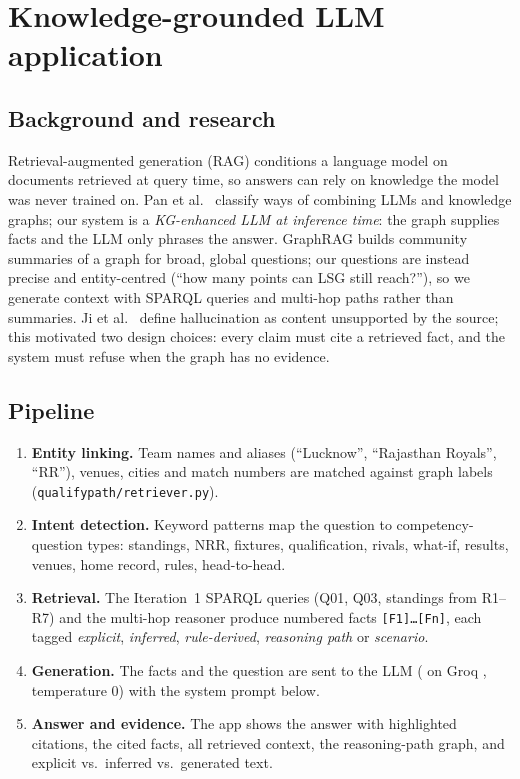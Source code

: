 \section{Knowledge-grounded LLM application}\label{sec:app}

\subsection{Background and research}
Retrieval-augmented generation (RAG) \citep{lewis2020rag} conditions a language model on documents retrieved at
query time, so answers can rely on knowledge the model was never trained on. Pan et al.\ \citep{pan2024unifying}
classify ways of combining LLMs and knowledge graphs; our system is a \emph{KG-enhanced LLM at inference time}:
the graph supplies facts and the LLM only phrases the answer. GraphRAG \citep{edge2024graphrag} builds community
summaries of a graph for broad, global questions; our questions are instead precise and entity-centred
(``how many points can LSG still reach?''), so we generate context with SPARQL queries and multi-hop paths
rather than summaries. Ji et al.\ \citep{ji2023hallucination} define hallucination as content unsupported by the
source; this motivated two design choices: every claim must cite a retrieved fact, and the system must refuse
when the graph has no evidence.

\subsection{Pipeline}
\begin{enumerate}
  \item \textbf{Entity linking.} Team names and aliases (``Lucknow'', ``Rajasthan Royals'', ``RR''), venues,
        cities and match numbers are matched against graph labels (\texttt{qualifypath/retriever.py}).
  \item \textbf{Intent detection.} Keyword patterns map the question to competency-question types: standings,
        NRR, fixtures, qualification, rivals, what-if, results, venues, home record, rules, head-to-head.
  \item \textbf{Retrieval.} The Iteration~1 SPARQL queries (Q01, Q03, standings from R1--R7) and the multi-hop
        reasoner produce numbered facts \texttt{[F1]\ldots[Fn]}, each tagged \emph{explicit},
        \emph{inferred}, \emph{rule-derived}, \emph{reasoning path} or \emph{scenario}.
  \item \textbf{Generation.} The facts and the question are sent to the LLM (\evalModel{} on Groq
        \citep{groqdocs,openai2025gptoss}, temperature 0) with the system prompt below.
  \item \textbf{Answer and evidence.} The app shows the answer with highlighted citations, the cited facts,
        all retrieved context, the reasoning-path graph, and explicit vs.\ inferred vs.\ generated text.
\end{enumerate}

